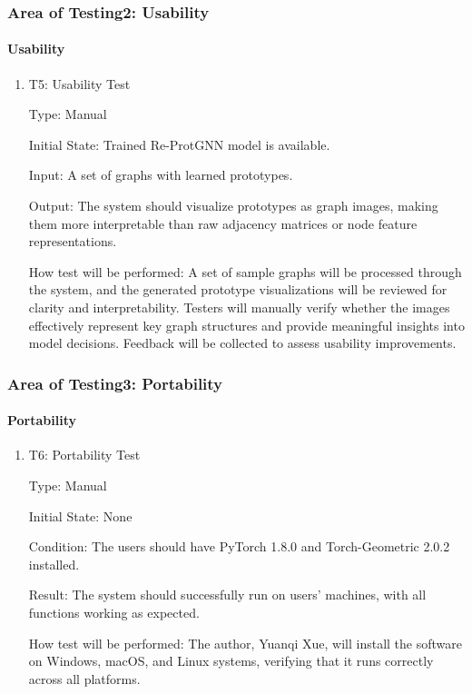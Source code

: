 \documentclass[12pt, titlepage]{article}
\begin{document}
\subsubsection{Area of Testing2: Usability}

\paragraph{Usability}

\begin{enumerate}
    \item{T5: Usability Test\\}

    Type: Manual
    					
    Initial State: Trained Re-ProtGNN model is available.
    					
    Input: A set of graphs with learned prototypes.
    					
    Output: The system should visualize prototypes as graph images, making them more interpretable than raw adjacency matrices or node feature representations.
    					
    How test will be performed: A set of sample graphs will be processed through the system, and the generated prototype visualizations will be reviewed for clarity and interpretability. Testers will manually verify whether the images effectively represent key graph structures and provide meaningful insights into model decisions. Feedback will be collected to assess usability improvements.
\end{enumerate}

\subsubsection{Area of Testing3: Portability}

\paragraph{Portability}

\begin{enumerate}
    \item{T6: Portability Test\\}

    Type: Manual
    					
    Initial State: None
    					
    Condition: The users should have PyTorch 1.8.0 and Torch-Geometric 2.0.2 installed.
    					
    Result: The system should successfully run on users' machines, with all functions working as expected.
    					
    How test will be performed: The author, Yuanqi Xue, will install the software on Windows, macOS, and Linux systems, verifying that it runs correctly across all platforms.
\end{enumerate}
\end{document}
